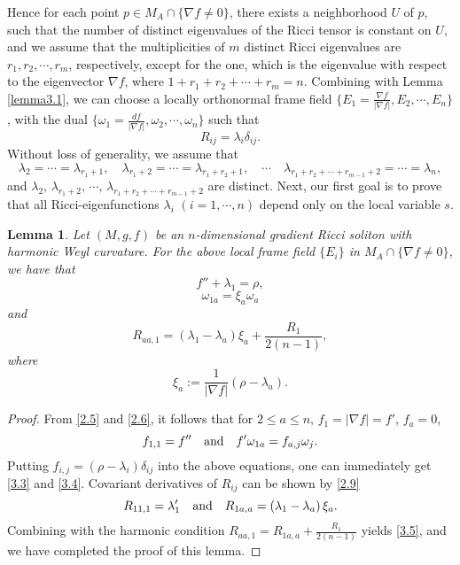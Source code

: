 \documentclass{amsart}
\newtheorem{lemma}[theorem]{Lemma}
\theoremstyle{definition}
\theoremstyle{remark}
\numberwithin{equation}{section}
\begin{document}
	Hence for each point $p\in M_A \cap \{ \nabla f \neq 0  \}$, there exists a neighborhood $U$ of $p$, 
	such that the number of distinct eigenvalues of the Ricci tensor is constant on $U$,
	and we assume that the multiplicities of $m$ distinct Ricci eigenvalues are $r_{1}, r_{2}, \cdots, r_{m}$, respectively, 
	except for the one, which is the eigenvalue with respect to the eigenvector $\nabla f$,
	where $1+r_{1}+r_{2}+ \cdots+ r_{m}=n $.
	Combining with Lemma \ref{lemma3.1},
	we can choose a locally orthonormal frame field
	$\{E_1= \frac{\nabla f}{|\nabla f| }, E_2, \cdots,  E_n\}$,
	with the dual $\{\omega_1= \frac{d f}{|\nabla f| }, \omega_2, \cdots, \omega_n\}$
	such that 
	\begin{equation}\label{3.2}
	R_{ij}=\lambda_i \delta_{ij}.
	\end{equation}
	Without loss of generality, we assume that 
	\[
	\lambda_{2}=\cdots=\lambda_{r_1+1}, \quad
	\lambda_{r_1+2}=\cdots=\lambda_{r_1+r_2+1},\quad
	\cdots  \quad 
	\lambda_{r_1+r_2+\cdots+r_{m-1}+2}=\cdots=\lambda_{n},
	\]
	and $\lambda_{2},\, \lambda_{r_1+2},\,\cdots,\,	\lambda_{r_1+r_2+\cdots+r_{m-1}+2}$
	are distinct.
	Next, our first goal is to prove that all Ricci-eigenfunctions $ \lambda_i $ $(i=1, \cdots ,n)$
	depend only on the local variable $s$.
	\begin{lemma} \label{lemma3.2}
		Let $(M, g, f)$ be an $n$-dimensional gradient Ricci soliton  with harmonic Weyl curvature.
		For the above local frame field $\{ E_i \}$ in $M_{A} \cap \{ \nabla f \neq 0 \}$, we have that
	\begin{equation}\label{3.3}
	f''+\lambda_1=\rho,
	\end{equation}
	\begin{equation}\label{3.4}
	\omega_{1a}= \xi_a \omega_{a}
	\end{equation}
	and 
	\begin{equation}\label{3.5}
	R_{aa,1}
	=\left(\lambda_1-\lambda_a \right)\xi_a+\frac{R_1}{2(n-1)},
	\end{equation}
	where 
	\begin{equation} \label{3.6}
	\xi_a:= \frac{1}{ |\nabla f|} (\rho-\lambda_{a}).
	\end{equation} 
	\end{lemma}
	\begin{proof}

	From \eqref{2.5} and \eqref{2.6}, it follows that for $2\leq a \leq n$, $f_{1}=|\nabla f|=f'$, $f_{a}=0$, 
    \[
	f_{1,1}=f'' \quad  {\rm and} \quad  f'\omega_{1a}=f_{a,j}\omega_{j}.
    \]
	Putting $f_{i,j}=\left(\rho-\lambda_i \right)\delta_{ij}$ into the above equations, 
	one can immediately get \eqref{3.3} and \eqref{3.4}.
	Covariant derivatives of $R_{ij}$ can be shown by \eqref{2.9}
  \[
	R_{11,1}=\lambda_1'  \quad {\rm and} \quad 
   R_{1a,a}=\left(\lambda_1-\lambda_a \right)\xi_a.
  \]
	Combining with the harmonic condition $R_{aa,1}=R_{1a,a}+\frac{R_1}{2(n-1)}$ yields \eqref{3.5},
	and we have completed the proof of this lemma.
	\end{proof}
\end{document}
